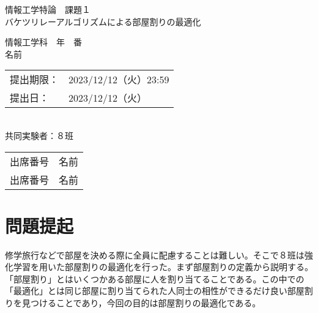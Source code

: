 \documentclass[titlepage]{ltjsreport}
\begin{document}
\makeatletter
\let\c@lstlisting=\c@figure
\makeatother
\begin{titlepage}
\vspace*{1em}
\begin{center}
\begin{huge}
情報工学特論　課題１
\\
\vspace{1em}
バケツリレーアルゴリズムによる部屋割りの最適化
\end{huge}
\end{center}
\vspace{6em}
\begin{flushright}
\begin{LARGE}
情報工学科　年　番
\\
\vspace{1em}
名前
\end{LARGE}
\end{flushright}
\vspace{4em}
\begin{flushleft}
\begin{Large}
\begin{tabular}{ll}
提出期限： & 2023/12/12（火）23:59
\\
提出日： & 2023/12/12（火）
\\
\end{tabular}
\\
\vspace{2em}
共同実験者：８班
\\
\vspace{1em}
\begin{tabular}{ll}
出席番号 & 名前
\\
出席番号 & 名前
\\
\end{tabular}
\end{Large}
\end{flushleft}
\end{titlepage}
\chapter{問題提起}
修学旅行などで部屋を決める際に全員に配慮することは難しい。そこで８班は強化学習を用いた部屋割りの最適化を行った。まず部屋割りの定義から説明する。「部屋割り」とはいくつかある部屋に人を割り当てることである。この中での「最適化」とは同じ部屋に割り当てられた人同士の相性ができるだけ良い部屋割りを見つけることであり，今回の目的は部屋割りの最適化である。
\end{document}
